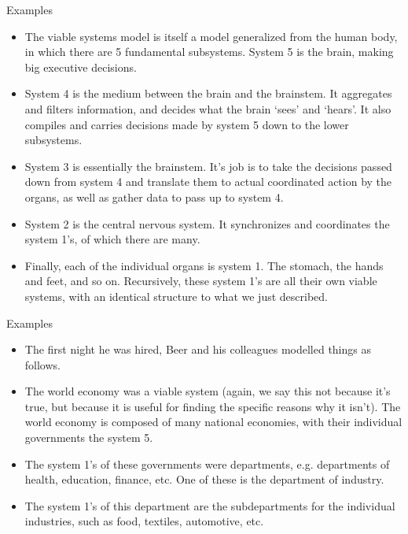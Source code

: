 \documentclass{beamer}
\begin{document}
\begin{frame}{Examples}
    \begin{itemize}
        \item The viable systems model is itself a model generalized from the human body, in which there are 5 fundamental subsystems. System 5 is the brain, making big executive decisions. 
        \item System 4 is the medium between the brain and the brainstem. It aggregates and filters information, and decides what the brain `sees' and `hears'. It also compiles and carries decisions made by system 5 down to the lower subsystems. 
        \item System 3 is essentially the brainstem. It's job is to take the decisions passed down from system 4 and translate them to actual coordinated action by the organs, as well as gather data to pass up to system 4. 
        \item System 2 is the central nervous system. It synchronizes and coordinates the system 1's, of which there are many. 
        \item Finally, each of the individual organs is system 1. The stomach, the hands and feet, and so on. Recursively, these system 1's are all their own viable systems, with an identical structure to what we just described.
    \end{itemize}
\end{frame}

\begin{frame}{Examples}
    \begin{itemize}
        \item The first night he was hired, Beer and his colleagues modelled things as follows.
        \item The world economy was a viable system (again, we say this not because it's true, but because it is useful for finding the specific reasons why it isn't). The world economy is composed of many national economies, with their individual governments the system 5. 
        \item The system 1's of these governments were departments, e.g. departments of health, education, finance, etc. One of these is the department of industry. 
        \item The system 1's of this department are the subdepartments for the individual industries, such as food, textiles, automotive, etc. 
    \end{itemize}
\end{frame}
\end{document}
